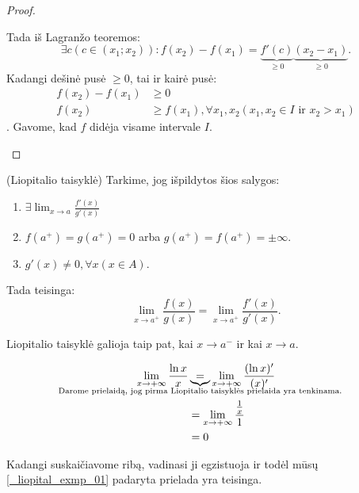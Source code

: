 \begin{prop}
\begin{proof}
\begin{description}
        Tada iš Lagranžo teoremos:
        \begin{equation*}
          \exists c (c \in (x_{1};x_{2})) : 
            f(x_{2}) - f(x_{1}) = 
            \underbrace{f'(c)}_{\geq 0}
            \underbrace{(x_{2} - x_{1})}_{\geq 0}.
        \end{equation*}
        Kadangi dešinė pusė $\geq 0$, tai ir kairė pusė:
        \begin{align*}
          f(x_{2}) - f(x_{1}) &\geq 0 \\
          f(x_{2}) &\geq f(x_{1}), \forall x_{1}, x_{2} 
            (x_{1}, x_{2} \in I \text{ ir } x_{2} > x_{1})
        \end{align*}.
        Gavome, kad $f$ didėja visame intervale $I$.

    \end{description}
  \end{proof}
\end{prop}

\begin{prop}
  (Liopitalio taisyklė) Tarkime, jog išpildytos šios salygos:
  \begin{enumerate}
    \item $\exists \lim_{x \to a} \frac{f'(x)}{g'(x)}$
    \item $f(a^{+}) = g(a^{+}) = 0$ arba 
      $g(a^{+}) = f(a^{+}) = \pm \infty$.
    \item $g'(x) \neq 0, \forall x (x \in A)$.
  \end{enumerate}

  Tada teisinga:
  \begin{equation*}
    \lim_{x \to a^{+}} \frac{f(x)}{g(x)} = 
    \lim_{x \to a^{+}} \frac{f'(x)}{g'(x)}.
  \end{equation*}
\end{prop}

\begin{note}
  Liopitalio taisyklė galioja taip pat, kai $x \to a^{-}$ ir kai 
  $x \to a$.
\end{note}

\begin{exmp}
  \begin{align}
    \lim_{x \to +\infty} \frac{\ln x}{x}
    &\underbrace{=}_{\mathclap{
      \text{Darome prielaidą, jog pirma Liopitalio taisyklės 
      prielaida yra tenkinama.}}}
    \lim_{x \to +\infty} \frac{(\ln x)'}{(x)'}
    \label{_liopital_exmp_01} \\
    &= \lim_{x \to +\infty} \frac{\frac{1}{x}}{1} \\
    &= 0
    \label{_liopital_exmp_02}
  \end{align}

  Kadangi suskaičiavome ribą, vadinasi ji egzistuoja ir todėl mūsų
  \ref{_liopital_exmp_01} padaryta prielada yra teisinga.
\end{exmp}

